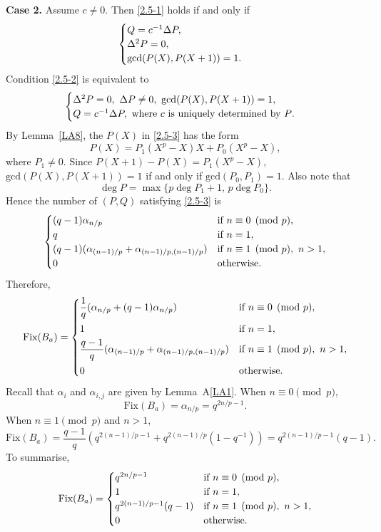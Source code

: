 \documentclass{amsart}
\numberwithin{equation}{section}
\theoremstyle{definition}
\begin{document}
\medskip
{\bf Case 2.} Assume $c\ne 0$. Then \eqref{2.5-1} holds if and only if
\begin{equation}\label{2.5-2}
\begin{cases}
Q=c^{-1}\Delta P,\cr
\Delta^2 P=0,\cr
\text{gcd}(P(X),P(X+1))=1.
\end{cases}
\end{equation}
Condition \eqref{2.5-2} is equivalent to
\begin{equation}\label{2.5-3}
\begin{cases}
\Delta^2P=0,\ \Delta P\ne 0,\ \text{gcd}(P(X),P(X+1))=1,\cr
Q=c^{-1}\Delta P,\ \text{where $c$ is uniquely determined by $P$}.
\end{cases}
\end{equation}
By Lemma~\ref{LA8}, the $P(X)$ in \eqref{2.5-3} has the form
\[
P(X)=P_1(X^p-X)X+P_0(X^p-X),
\]
where $P_1\ne 0$. Since $P(X+1)-P(X)=P_1(X^p-X)$, $\text{gcd}(P(X),P(X+1))=1$ if and only if $\text{gcd}(P_0,P_1)=1$. Also note that 
\[
\deg P=\max\{p\deg P_1+1,\,p\deg P_0\}.
\]
Hence the number of $(P,Q)$ satisfying \eqref{2.5-3} is
\[
\begin{cases}
(q-1)\alpha_{n/p}&\text{if}\ n\equiv 0\pmod p,\cr
q&\text{if}\ n=1,\cr
(q-1)(\alpha_{(n-1)/p}+\alpha_{(n-1)/p,(n-1)/p})&\text{if}\ n\equiv 1\pmod p,\ n>1,\cr
0&\text{otherwise}.
\end{cases}
\]
Therefore,
\[
\text{Fix}(B_a)=\begin{cases}
\displaystyle\frac 1q(\alpha_{n/p}+(q-1)\alpha_{n/p})&\text{if}\ n\equiv 0\pmod p,\vspace{0.3em}\cr
1&\text{if}\ n=1,\vspace{0.3em}\cr
\displaystyle\frac {q-1}q(\alpha_{(n-1)/p}+\alpha_{(n-1)/p,(n-1)/p})&\text{if}\ n\equiv 1\pmod p,\ n>1,\vspace{0.3em}\cr
0&\text{otherwise}.
\end{cases}
\]
Recall that $\alpha_i$ and $\alpha_{i,j}$ are given by Lemma~A\ref{LA1}. When $n\equiv 0\pmod p$,
\[
\text{Fix}(B_a)=\alpha_{n/p}=q^{2n/p-1}.
\]
When $n\equiv 1\pmod p$ and $n>1$,
\[
\text{Fix}(B_a)=\frac{q-1}q(q^{2(n-1)/p-1}+q^{2(n-1)/p}(1-q^{-1}))=q^{2(n-1)/p-1}(q-1).
\]
To summarise,
\begin{equation}\label{FixBa}
\text{Fix}(B_a)=\begin{cases}
q^{2n/p-1}&\text{if}\ n\equiv 0\pmod p,\cr
1&\text{if}\ n=1,\cr
q^{2(n-1)/p-1}(q-1)&\text{if}\ n\equiv 1\pmod p,\ n>1,\cr
0&\text{otherwise}.
\end{cases}
\end{equation}
\end{document}
